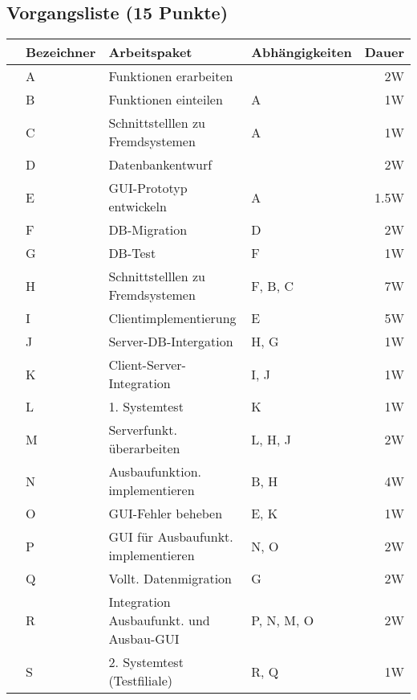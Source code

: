 \documentclass{scrartcl}
\begin{document}
\subsection{Vorgangsliste (15 Punkte)}
\begin{center}
   \renewcommand{\arraystretch}{1.5}
   \begin{tabular}{l:lllr}
      \toprule
      &Bezeichner & Arbeitspaket & Abhängigkeiten & Dauer\\
      \midrule
      &A & Funktionen erarbeiten & & 2W\\
      &B & Funktionen einteilen & A & 1W\\
      &C & Schnittstelllen zu Fremdsystemen & A & 1W\\
      &D & Datenbankentwurf & & 2W \\
      &E & GUI-Prototyp entwickeln & A & 1.5W\\
      \midrule
      &F & DB-Migration & D & 2W \\
      &G & DB-Test & F& 1W \\
      &H & Schnittstelllen zu Fremdsystemen & F, B, C & 7W \\
      &I & Clientimplementierung & E & 5W \\
      &J & Server-DB-Intergation & H, G& 1W \\
      &K & Client-Server-Integration & I, J & 1W \\
      &L & 1. Systemtest & K & 1W \\
      \midrule
      &M & Serverfunkt. überarbeiten & L, H, J& 2W \\
      &N & Ausbaufunktion.  implementieren & B, H & 4W\\
      &O & GUI-Fehler beheben & E, K & 1W \\
      &P & GUI für Ausbaufunkt. implementieren & N, O & 2W \\
      &Q & Vollt. Datenmigration & G & 2W \\
      &R & Integration Ausbaufunkt.  und Ausbau-GUI & P, N, M, O & 2W \\
      &S & 2. Systemtest (Testfiliale) & R, Q & 1W \\

\end{tabular}
\end{center}
\end{document}
